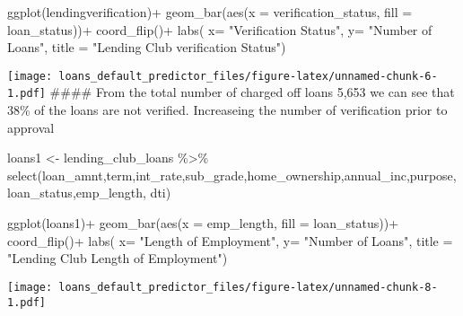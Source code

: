 \documentclass[
]{article}
\newenvironment{Shaded}{\begin{snugshade}}{\end{snugshade}}
\newcommand{\AttributeTok}[1]{\textcolor[rgb]{0.77,0.63,0.00}{#1}}
\newcommand{\FunctionTok}[1]{\textcolor[rgb]{0.00,0.00,0.00}{#1}}
\newcommand{\NormalTok}[1]{#1}
\newcommand{\OtherTok}[1]{\textcolor[rgb]{0.56,0.35,0.01}{#1}}
\newcommand{\SpecialCharTok}[1]{\textcolor[rgb]{0.00,0.00,0.00}{#1}}
\newcommand{\StringTok}[1]{\textcolor[rgb]{0.31,0.60,0.02}{#1}}
\begin{document}
\begin{Shaded}
\begin{Highlighting}[]
\FunctionTok{ggplot}\NormalTok{(lendingverification)}\SpecialCharTok{+}
  \FunctionTok{geom\_bar}\NormalTok{(}\FunctionTok{aes}\NormalTok{(}\AttributeTok{x =}\NormalTok{ verification\_status, }\AttributeTok{fill =}\NormalTok{ loan\_status))}\SpecialCharTok{+} 
  \FunctionTok{coord\_flip}\NormalTok{()}\SpecialCharTok{+}
\FunctionTok{labs}\NormalTok{( }\AttributeTok{x=} \StringTok{"Verification Status"}\NormalTok{,}
        \AttributeTok{y=} \StringTok{"Number of Loans"}\NormalTok{,}
        \AttributeTok{title =} \StringTok{"Lending Club verification Status"}\NormalTok{)}
\end{Highlighting}
\end{Shaded}

\texttt{[image: loans\_default\_predictor\_files/figure-latex/unnamed-chunk-6-1.pdf]}
\#\#\#\# From the total number of charged off loans 5,653 we can see
that 38\% of the loans are not verified. Increaseing the number of
verification prior to approval

\begin{Shaded}
\begin{Highlighting}[]
\NormalTok{loans1 }\OtherTok{\textless{}{-}}\NormalTok{ lending\_club\_loans }\SpecialCharTok{\%\textgreater{}\%}
  \FunctionTok{select}\NormalTok{(loan\_amnt,term,int\_rate,sub\_grade,home\_ownership,annual\_inc,purpose, loan\_status,emp\_length, dti)}
\end{Highlighting}
\end{Shaded}

\begin{Shaded}
\begin{Highlighting}[]
\FunctionTok{ggplot}\NormalTok{(loans1)}\SpecialCharTok{+}
  \FunctionTok{geom\_bar}\NormalTok{(}\FunctionTok{aes}\NormalTok{(}\AttributeTok{x =}\NormalTok{ emp\_length, }\AttributeTok{fill =}\NormalTok{ loan\_status))}\SpecialCharTok{+} 
  \FunctionTok{coord\_flip}\NormalTok{()}\SpecialCharTok{+}
\FunctionTok{labs}\NormalTok{( }\AttributeTok{x=} \StringTok{"Length of Employment"}\NormalTok{,}
        \AttributeTok{y=} \StringTok{"Number of Loans"}\NormalTok{,}
        \AttributeTok{title =} \StringTok{"Lending Club Length of Employment"}\NormalTok{)}
\end{Highlighting}
\end{Shaded}

\texttt{[image: loans\_default\_predictor\_files/figure-latex/unnamed-chunk-8-1.pdf]}
\end{document}
